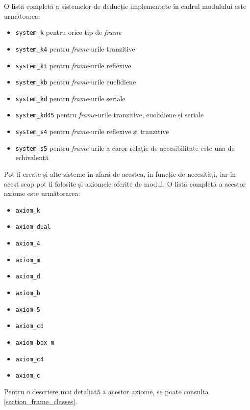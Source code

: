 \documentclass[12pt, openany]{book}
\newcommand{\mysectionreference}[1]{\autoref{#1}}
\begin{document}
            \par{}
                O listă completă a sistemelor de deducție implementate în cadrul modulului este următoarea: 
                \begin{itemize}
                    \item \texttt{system\_k} pentru orice tip de \textit{frame}
                    \item \texttt{system\_k4} pentru \textit{frame}-urile tranzitive
                    \item \texttt{system\_kt} pentru \textit{frame}-urile reflexive
                    \item \texttt{system\_kb} pentru \textit{frame}-urile euclidiene
                    \item \texttt{system\_kd} pentru \textit{frame}-urile seriale
                    \item \texttt{system\_kd45} pentru \textit{frame}-urile tranzitive, euclidiene și seriale
                    \item \texttt{system\_s4} pentru \textit{frame}-urile reflexive și tranzitive
                    \item \texttt{system\_s5} pentru \textit{frame}-urile a căror relație de accesibilitate este una 
                    de echivalență
                \end{itemize}
                Pot fi create și alte sisteme în afară de acestea, în funcție de necesități, iar în acest scop pot fi 
                folosite și axiomele oferite de modul. O listă completă a acestor axiome este următorarea:
                \begin{multicols}{3}
                    \noindent
                    \begin{itemize}
                        \item \texttt{axiom\_k}
                        \item \texttt{axiom\_dual}
                        \item \texttt{axiom\_4}
                        \item \texttt{axiom\_m}
                        \item \texttt{axiom\_d}
                        \item \texttt{axiom\_b}
                        \item \texttt{axiom\_5}
                        \item \texttt{axiom\_cd}
                        \item \texttt{axiom\_box\_m}
                        \item \texttt{axiom\_c4}
                        \item \texttt{axiom\_c}
                    \end{itemize}
                \end{multicols}
                Pentru o descriere mai detaliată a acestor axiome, se poate consulta 
                \mysectionreference{section_frame_classes}.
            
\end{document}
